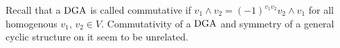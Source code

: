 \documentclass[\MainFolder/Text.tex]{subfiles}
\begin{document}
Recall that a $\mathrm{DGA}$ is called commutative if $v_1 \wedge v_2 = (-1)^{v_1 v_2} v_2\wedge v_1$ for all homogenous $v_1$, $v_2\in V$. Commutativity of a $\mathrm{DGA}$ and symmetry of a general cyclic structure on it seem to be unrelated.

%
\end{document}
